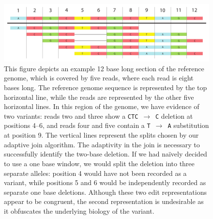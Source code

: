 \documentclass[11pt]{article} %
\begin{document}
\begin{figure}[h]
\begin{center}
\includegraphics[width=0.9\linewidth]{bases.pdf}
\caption{This figure depicts an example 12 base long section of the reference genome, which is
covered by five reads, where each read is eight bases long. The reference genome sequence is
represented by the top horizontal line, while the reads are represented by the other five
horizontal lines. In this region of the genome, we have evidence of two variants: reads two and
three show a \texttt{CTC}~$\rightarrow$~\texttt{C} deletion at positions 4--6, and reads four and
five contain a \texttt{T}~$\rightarrow$~\texttt{A} substitution at position 9. The vertical
lines represent the splits chosen by our adaptive join algorithm. The adaptivity in the join
is necessary to successfully identify the two-base deletion. If we had na\"{i}vely decided to
use a one base window, we would split the deletion into three separate alleles: position 4 would
have not been recorded as a variant, while positions 5 and 6 would be independently recorded as
separate one base deletions. Although these two edit representations appear to be congruent,
the second representation is undesirable as it obfuscates the underlying biology of the variant.}
\label{fig:bases}
\end{center}
\end{figure}
\end{document}
